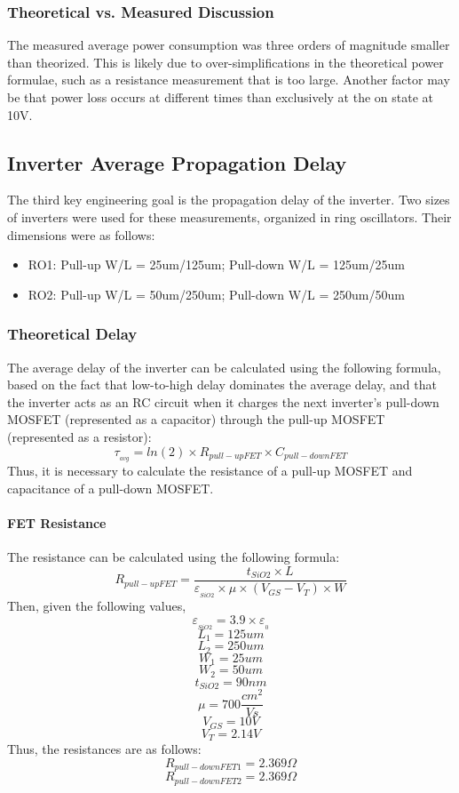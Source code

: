\documentclass[12pt]{article}
\begin{document}
\subsubsection{Theoretical vs. Measured Discussion}
The measured average power consumption was three orders of magnitude smaller than theorized. This is likely due to over-simplifications in the theoretical power formulae, such as a resistance measurement that is too large. Another factor may be that power loss occurs at different times than exclusively at the on state at 10V.

\subsection{Inverter Average Propagation Delay}
The third key engineering goal is the propagation delay of the inverter. Two sizes of inverters were used for these measurements, organized in ring oscillators. Their dimensions were as follows:
\begin{itemize}
    \item RO1: Pull-up W/L = 25um/125um; Pull-down W/L = 125um/25um
    \item RO2: Pull-up W/L = 50um/250um; Pull-down W/L = 250um/50um
\end{itemize}

\subsubsection{Theoretical Delay}
The average delay of the inverter can be calculated using the following formula, based on the fact that low-to-high delay dominates the average delay, and that the inverter acts as an RC circuit when it charges the next inverter's pull-down MOSFET (represented as a capacitor) through the pull-up MOSFET (represented as a resistor):
\[\tau_{_{avg}} = ln(2) \times R_{pull-up FET} \times C_{pull-down FET} \]
Thus, it is necessary to calculate the resistance of a pull-up MOSFET and capacitance of a pull-down MOSFET.
\paragraph{FET Resistance} The resistance can be calculated using the following formula:
\[R_{pull-up FET} = \frac{t_{SiO2} \times L} {\varepsilon_{_{SiO2}} \times \mu \times (V_{GS} - V_T) \times W} \]
Then, given the following values,
\[\varepsilon_{_{SiO2}} = 3.9 \times \varepsilon_{_0} \]
\[L_1 = 125um\]
\[L_2 = 250um\]
\[W_1 = 25um\]
\[W_2 = 50um\]
\[t_{SiO2} = 90nm \]
\[\mu = 700\frac{cm^2}{Vs} \]
\[V_{GS} = 10V \]
\[V_T = 2.14V \]
Thus, the resistances are as follows:
\[R_{pull-down FET 1} = 2.369\Omega\]
\[R_{pull-down FET 2} = 2.369\Omega\]
\end{document}
